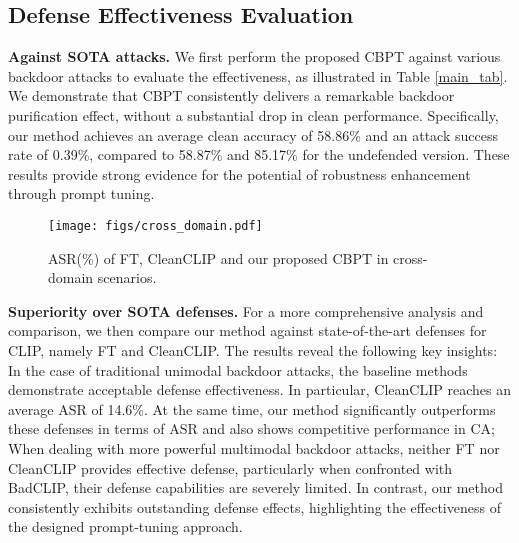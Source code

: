 \subsection{Defense Effectiveness Evaluation}

\textbf{Against SOTA attacks.}
We first perform the proposed CBPT against various backdoor attacks to evaluate the effectiveness, as illustrated in Table \ref{main_tab}. We demonstrate that CBPT consistently delivers a remarkable backdoor purification effect, without a substantial drop in clean performance. Specifically, our method achieves an average clean accuracy of 58.86\% and an attack success rate of 0.39\%, compared to 58.87\% and 85.17\% for the undefended version. These results provide strong evidence for the potential of robustness enhancement through prompt tuning.



\begin{figure}[t] %
    \raggedleft
    \texttt{[image: figs/cross\_domain.pdf]}
    \hfill %
    \caption{ASR(\%) of FT, CleanCLIP and our proposed CBPT in cross-domain scenarios.}
    \label{fig:cross_domain}
\end{figure}

\textbf{Superiority over SOTA defenses.}
For a more comprehensive analysis and comparison, we then compare our method against state-of-the-art defenses for CLIP, namely FT and CleanCLIP. The results reveal the following key insights:  In the case of traditional unimodal backdoor attacks, the baseline methods demonstrate acceptable defense effectiveness. In particular, CleanCLIP reaches an average ASR of 14.6\%. At the same time, our method significantly outperforms these defenses in terms of ASR and also shows competitive performance in CA;  When dealing with more powerful multimodal backdoor attacks, neither FT nor CleanCLIP provides effective defense, particularly when confronted with BadCLIP, their defense capabilities are severely limited. In contrast, our method consistently exhibits outstanding defense effects, highlighting the effectiveness of the designed prompt-tuning approach.

